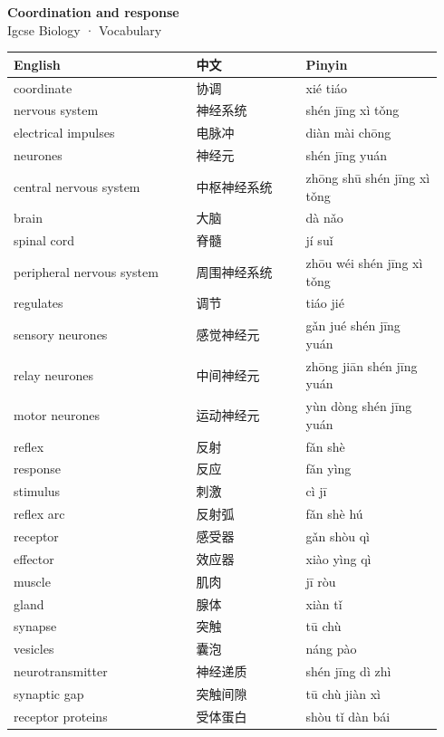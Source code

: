 \documentclass[11pt]{article}
\begin{document}
\begin{center}
  {\LARGE\bfseries Coordination and response}\\[0.35em]
  {\large Igcse Biology · Vocabulary}
\end{center}
\vspace{0.6em}

\begin{longtable}{@{}p{0.40\linewidth}p{0.24\linewidth}p{0.30\linewidth}@{}}
\toprule
\textbf{English} & \textbf{中文} & \textbf{Pinyin} \\
\midrule
\endhead
\bottomrule
\endlastfoot
coordinate & 协调 & xié tiáo \\
nervous system & 神经系统 & shén jīng xì tǒng \\
electrical impulses & 电脉冲 & diàn mài chōng \\
neurones & 神经元 & shén jīng yuán \\
central nervous system & 中枢神经系统 & zhōng shū shén jīng xì tǒng \\
brain & 大脑 & dà nǎo \\
spinal cord & 脊髓 & jí suǐ \\
peripheral nervous system & 周围神经系统 & zhōu wéi shén jīng xì tǒng \\
regulates & 调节 & tiáo jié \\
sensory neurones & 感觉神经元 & gǎn jué shén jīng yuán \\
relay neurones & 中间神经元 & zhōng jiān shén jīng yuán \\
motor neurones & 运动神经元 & yùn dòng shén jīng yuán \\
reflex & 反射 & fǎn shè \\
response & 反应 & fǎn yìng \\
stimulus & 刺激 & cì jī \\
reflex arc & 反射弧 & fǎn shè hú \\
receptor & 感受器 & gǎn shòu qì \\
effector & 效应器 & xiào yìng qì \\
muscle & 肌肉 & jī ròu \\
gland & 腺体 & xiàn tǐ \\
synapse & 突触 & tū chù \\
vesicles & 囊泡 & náng pào \\
neurotransmitter & 神经递质 & shén jīng dì zhì \\
synaptic gap & 突触间隙 & tū chù jiàn xì \\
receptor proteins & 受体蛋白 & shòu tǐ dàn bái \\

\end{longtable}
\end{document}
